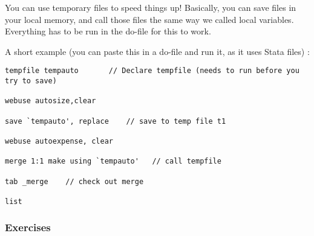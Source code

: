 \documentclass[
]{article}
\begin{document}
You can use temporary files to speed things up! Basically, you can save
files in your local memory, and call those files the same way we called
local variables. Everything has to be run in the do-file for this to
work.

A short example (you can paste this in a do-file and run it, as it uses
Stata files) :

\begin{verbatim}
tempfile tempauto       // Declare tempfile (needs to run before you try to save)

webuse autosize,clear

save `tempauto', replace    // save to temp file t1

webuse autoexpense, clear 

merge 1:1 make using `tempauto'   // call tempfile

tab _merge    // check out merge

list
\end{verbatim}

\hypertarget{exercises}{%
\subsubsection{Exercises}\label{exercises}}
\end{document}
